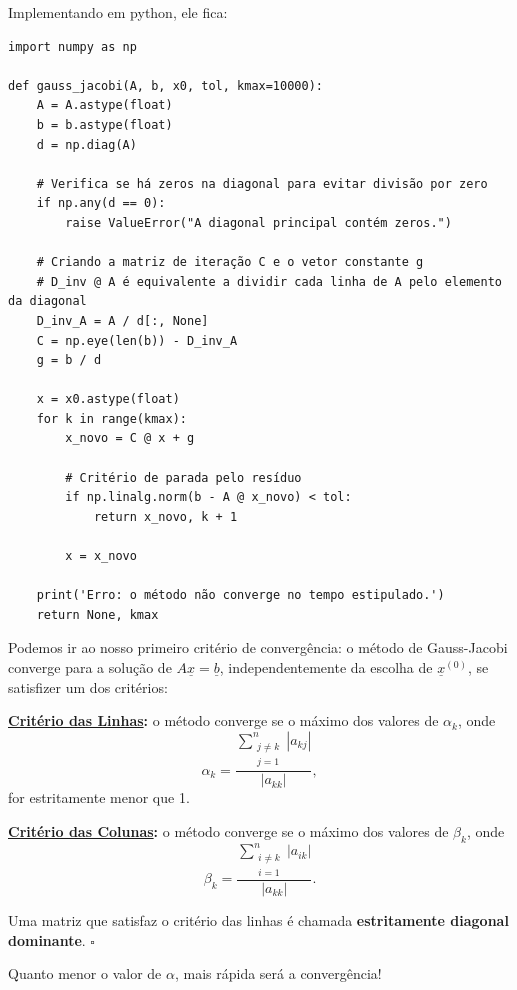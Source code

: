 \documentclass[../numerical_methods.tex]{subfiles}
\begin{document}
Implementando em python, ele fica:
\begin{listing}[H]
	\caption{Método de Gauss-Jacobi em Python}
	\begin{verbatim}
import numpy as np

def gauss_jacobi(A, b, x0, tol, kmax=10000):
    A = A.astype(float)
    b = b.astype(float)
    d = np.diag(A)

    # Verifica se há zeros na diagonal para evitar divisão por zero
    if np.any(d == 0):
        raise ValueError("A diagonal principal contém zeros.")

    # Criando a matriz de iteração C e o vetor constante g
    # D_inv @ A é equivalente a dividir cada linha de A pelo elemento da diagonal
    D_inv_A = A / d[:, None]
    C = np.eye(len(b)) - D_inv_A
    g = b / d

    x = x0.astype(float)
    for k in range(kmax):
        x_novo = C @ x + g

        # Critério de parada pelo resíduo
        if np.linalg.norm(b - A @ x_novo) < tol:
            return x_novo, k + 1

        x = x_novo

    print('Erro: o método não converge no tempo estipulado.')
    return None, kmax
\end{verbatim}
\end{listing}
Podemos ir ao nosso primeiro critério de convergência: o método de Gauss-Jacobi converge para a solução de \(A\underline{x} = \underline{b}\), independentemente da escolha de \(\underline{x}^{(0)}\), se satisfizer um dos critérios:

\textbf{\underline{Critério das Linhas}:} o método converge se o máximo dos valores de \(\alpha_{k}\), onde
\[
	\alpha_{k} = \frac{\sum\limits_{\substack{j\neq k \\ j=1}}^{n}| a_{kj} |}{| a_{kk} |},
\]
for estritamente menor que 1.

\textbf{\underline{Critério das Colunas}:} o método converge se o máximo dos valores de \(\beta_{k}\), onde
\[
	\beta_{k} = \frac{\sum\limits_{\substack{i\neq k \\ i=1}}^{n}| a_{ik} |}{| a_{kk} |}.
\]
\begin{def*}
	Uma matriz que satisfaz o critério das linhas é chamada \textbf{estritamente diagonal dominante}. \(\square\)
\end{def*}
Quanto menor o valor de \(\alpha \), mais rápida será a convergência!
\end{document}
